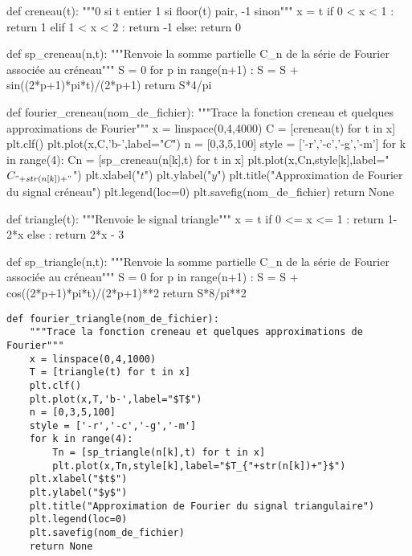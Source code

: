 \question{}
\begin{pyverbatim}
def creneau(t):
    """0 si t entier
       1 si floor(t) pair, -1 sinon"""
    x = t%
    if 0 < x < 1 : 
        return 1
    elif 1 < x < 2 : 
        return -1
    else:
        return 0
\end{pyverbatim}
\question{}
\begin{pyverbatim}
def sp_creneau(n,t):
    """Renvoie la somme partielle C_n de la série de Fourier associée au créneau"""
    S = 0
    for p in range(n+1) : 
        S = S + sin((2*p+1)*pi*t)/(2*p+1)
    return S*4/pi
\end{pyverbatim}
\question{}
\begin{pyverbatim}
def fourier_creneau(nom_de_fichier):
    """Trace la fonction creneau et quelques approximations de Fourier"""
    x = linspace(0,4,4000)
    C = [creneau(t) for t in x]
    plt.clf()
    plt.plot(x,C,'b-',label="$C$")
    n = [0,3,5,100]
    style = ['-r','-c','-g','-m']
    for k in range(4):
        Cn = [sp_creneau(n[k],t) for t in x]
        plt.plot(x,Cn,style[k],label="$C_{"+str(n[k])+"}$")
    plt.xlabel("$t$")
    plt.ylabel("$y$")
    plt.title("Approximation de Fourier du signal créneau")
    plt.legend(loc=0)
    plt.savefig(nom_de_fichier)
    return None
\end{pyverbatim}
\question{}
\begin{pyverbatim}
def triangle(t):
    """Renvoie le signal triangle"""
    x = t %
    if 0 <= x <= 1 :
        return 1-2*x
    else : 
        return 2*x - 3 
\end{pyverbatim}
\question{}
\begin{pyverbatim}
def sp_triangle(n,t):
    """Renvoie la somme partielle C_n de la série de Fourier associée au créneau"""
    S = 0
    for p in range(n+1) : 
        S = S + cos((2*p+1)*pi*t)/(2*p+1)**2
    return S*8/pi**2
\end{pyverbatim}
\question{}
\begin{lstlisting}
def fourier_triangle(nom_de_fichier):
    """Trace la fonction creneau et quelques approximations de Fourier"""
    x = linspace(0,4,1000)
    T = [triangle(t) for t in x]
    plt.clf()
    plt.plot(x,T,'b-',label="$T$")
    n = [0,3,5,100]
    style = ['-r','-c','-g','-m']
    for k in range(4):
        Tn = [sp_triangle(n[k],t) for t in x]
        plt.plot(x,Tn,style[k],label="$T_{"+str(n[k])+"}$")
    plt.xlabel("$t$")
    plt.ylabel("$y$")
    plt.title("Approximation de Fourier du signal triangulaire")
    plt.legend(loc=0)
    plt.savefig(nom_de_fichier)
    return None
\end{lstlisting}